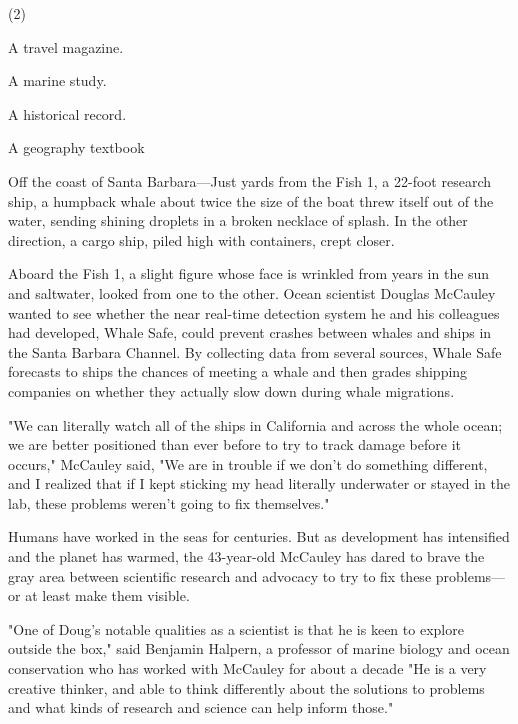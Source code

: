 \documentclass{英语试卷}
\begin{document}
\begin{choices}(2)
  \item A travel magazine.
  \item A marine study.
  \item A historical record.
  \item A geography textbook
\end{choices}
\par Off the coast of Santa Barbara—Just yards from the Fish 1, a 22-foot research ship, a humpback whale about twice the size of the boat threw itself out of the water, sending shining droplets in a broken necklace of splash. In the other direction, a cargo ship, piled high with containers, crept closer.\par
\par Aboard the Fish 1, a slight figure whose face is wrinkled from years in the sun and saltwater, looked from one to the other. Ocean scientist Douglas McCauley wanted to see whether the near real-time detection system he and his colleagues had developed, Whale Safe, could prevent crashes between whales and ships in the Santa Barbara Channel. By collecting data from several sources, Whale Safe forecasts to ships the chances of meeting a whale and then grades shipping companies on whether they actually slow down during whale migrations.\par
\par "We can literally watch all of the ships in California and across the whole ocean; we are better positioned than ever before to try to track damage before it occurs," McCauley said, "We are in trouble if we don't do something different, and I realized that if I kept sticking my head literally underwater or stayed in the lab, these problems weren't going to fix themselves."\par
\par Humans have worked in the seas for centuries. But as development has intensified and the planet has warmed, the 43-year-old McCauley has dared to brave the gray area between scientific research and advocacy to try to fix these problems—or at least make them visible.\par
\par "One of Doug's notable qualities as a scientist is that he is keen to explore outside the box," said Benjamin Halpern, a professor of marine biology and ocean conservation who has worked with McCauley for about a decade "He is a very creative thinker, and able to think differently about the solutions to problems and what kinds of research and science can help inform those."\par
\end{document}
